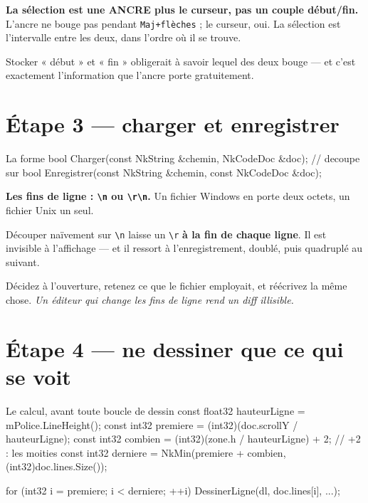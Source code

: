 \begin{nkretenir}
\textbf{La sélection est une ANCRE plus le curseur, pas un couple début/fin.}
L'ancre ne bouge pas pendant \texttt{Maj+flèches} ; le curseur, oui. La sélection
est l'intervalle entre les deux, dans l'ordre où il se trouve.

Stocker « début » et « fin » obligerait à savoir lequel des deux bouge --- et
c'est exactement l'information que l'ancre porte gratuitement.
\end{nkretenir}

\section{Étape 3 --- charger et enregistrer}

\begin{nkcode}{La forme}
bool Charger(const NkString &chemin, NkCodeDoc &doc);   // decoupe sur \n
bool Enregistrer(const NkString &chemin, const NkCodeDoc &doc);
\end{nkcode}

\begin{nkpiege}
\textbf{Les fins de ligne : \texttt{\textbackslash n} ou
\texttt{\textbackslash r\textbackslash n}.} Un fichier Windows en porte deux
octets, un fichier Unix un seul.

Découper naïvement sur \texttt{\textbackslash n} laisse un
\texttt{\textbackslash r} \textbf{à la fin de chaque ligne}. Il est invisible à
l'affichage --- et il ressort à l'enregistrement, doublé, puis quadruplé au
suivant.

Décidez à l'ouverture, retenez ce que le fichier employait, et réécrivez la
même chose. \emph{Un éditeur qui change les fins de ligne rend un diff
illisible.}
\end{nkpiege}

\section{Étape 4 --- ne dessiner que ce qui se voit}

\begin{nkcode}{Le calcul, avant toute boucle de dessin}
const float32 hauteurLigne = mPolice.LineHeight();
const int32 premiere = (int32)(doc.scrollY / hauteurLigne);
const int32 combien  = (int32)(zone.h / hauteurLigne) + 2;   // +2 : les moities
const int32 derniere = NkMin(premiere + combien, (int32)doc.lines.Size());

for (int32 i = premiere; i < derniere; ++i) { DessinerLigne(dl, doc.lines[i], ...); }
\end{nkcode}

